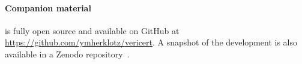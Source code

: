 
\paragraph{Companion material}
\vericert{} is fully open source and available on GitHub at \url{https://github.com/ymherklotz/vericert}. A snapshot of the \vericert{} development is also available in a Zenodo repository~\cite{yann_herklotz_2021_5093839}.

